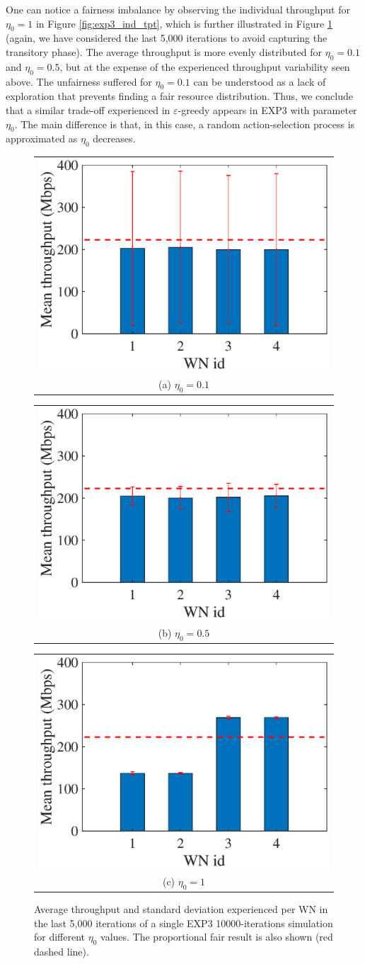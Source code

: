 \documentclass[10pt,journal,compsoc]{IEEEtran}
\begin{document}
	One can notice a fairness imbalance by observing the individual throughput for $\eta_0 = 1$ in Figure \ref{fig:exp3_ind_tpt}, which is further illustrated in Figure \ref{fig:exp3_avg_tpt} (again, we have considered the last 5,000 iterations to avoid capturing the transitory phase). The average throughput is more evenly distributed for $\eta_0 = 0.1$ and $\eta_0 = 0.5$, but at the expense of the experienced throughput variability seen above. The unfairness suffered for $\eta_0 = 0.1$ can be understood as a lack of exploration that prevents finding a fair resource distribution. Thus, we conclude that a similar trade-off experienced in $\varepsilon$-greedy appears in EXP3 with parameter $\eta_0$. The main difference is that, in this case, a random action-selection process is approximated as $\eta_0$ decreases.
	\begin{figure}
		\centering
		\begin{tabular}{@{}c@{}}
			\includegraphics[width=.25\textwidth]{images/NEW_mean_tpt_EXP3_eta01} \\[\abovecaptionskip]
			\small (a) $\eta_0 = 0.1$
			\label{fig:exp3_eta01_avg_tpt}
		\end{tabular}	
		\hspace{\floatsep}	
		\begin{tabular}{@{}c@{}}
			\includegraphics[width=.25\textwidth]{images/NEW_mean_tpt_EXP3_eta05} \\[\abovecaptionskip]
			\small (b) $\eta_0 = 0.5$
			\label{fig:exp3_eta05_avg_tpt}
		\end{tabular}
		\hspace{\floatsep}
		\begin{tabular}{@{}c@{}}
			\includegraphics[width=.25\textwidth]{images/NEW_mean_tpt_EXP3_eta1} \\[\abovecaptionskip]
			\small (c) $\eta_0 = 1$
			\label{fig:exp3_eta1_avg_tpt}
		\end{tabular}
		\caption{Average throughput and standard deviation experienced per WN in the last 5,000 iterations of a single EXP3 10000-iterations simulation for different $\eta_0$ values. The proportional fair result is also shown (red dashed line).}
		\label{fig:exp3_avg_tpt}
	\end{figure}
	
\end{document}
